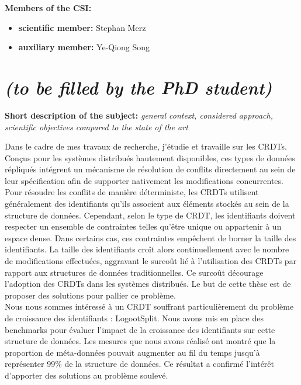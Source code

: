 \documentclass[12pt]{article}
\newcommand{\commentaire}[1]{\small\textit{#1}}
\begin{document}
\noindent\textbf{Members of the CSI:}
\begin{itemize}
\item\textbf{scientific member:}
  Stephan Merz
\item\textbf{auxiliary member:}
  Ye-Qiong Song
\end{itemize}

\newpage
\section*{ \textit{\small (to be filled by the PhD student)}}

\noindent\textbf{Short description of the subject:}
\commentaire{%
  general context, considered approach, scientific objectives
  compared to the state of the art\\}

Dans le cadre de mes travaux de recherche, j'étudie et travaille sur les \acfp{CRDT}.
Conçus pour les systèmes distribués hautement disponibles, ces types de données répliqués intégrent un mécanisme de résolution de conflits directement au sein de leur spécification afin de supporter nativement les modifications concurrentes.
Pour résoudre les conflits de manière déterministe, les \acp{CRDT} utilisent généralement des identifiants qu'ils associent aux éléments stockés au sein de la structure de données.
Cependant, selon le type de \ac{CRDT}, les identifiants doivent respecter un ensemble de contraintes telles qu'être unique ou appartenir à un espace dense.
Dans certains cas, ces contraintes empêchent de borner la taille des identifiants.
La taille des identifiants croît alors continuellement avec le nombre de modifications effectuées, aggravant le surcoût lié à l'utilisation des \acp{CRDT} par rapport aux structures de données traditionnelles.
Ce surcoût décourage l'adoption des \acp{CRDT} dans les systèmes distribués.
Le but de cette thèse est de proposer des solutions pour pallier ce problème.
\\

Nous nous sommes intéressé à un \ac{CRDT} souffrant particulièrement du problème de croissance des identifiants : LogootSplit.
Nous avons mis en place des benchmarks pour évaluer l'impact de la croissance des identifiants sur cette structure de données.
Les mesures que nous avons réalisé ont montré que la proportion de méta-données pouvait augmenter au fil du temps jusqu'à représenter 99\% de la structure de données.
Ce résultat a confirmé l'intérêt d'apporter des solutions au problème soulevé.
\\
\end{document}
